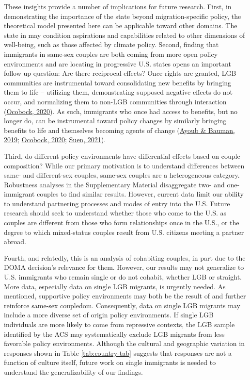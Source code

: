 \documentclass[
  11pt,
]{article}
\begin{document}
These insights provide a number of implications for future research. First, in demonstrating the importance of the state beyond migration-specific policy, the theoretical model presented here can be applicable toward other domains. The state in may condition aspirations and capabilities related to other dimensions of well-being, such as those affected by climate policy. Second, finding that immigrants in same-sex couples are both coming from more open policy environments and are locating in progressive U.S. states opens an important follow-up question: Are there reciprocal effects? Once rights are granted, LGB communities are instrumental toward consolidating new benefits by bringing them to life -- utilizing them, demonstrating supposed negative effects do not occur, and normalizing them to non-LGB communities through interaction (\protect\hyperlink{ref-ocobock_2020_leveraging}{Ocobock, 2020}). As such, immigrants who once had access to benefits, but no longer do, can be instrumental toward policy changes by similarly bringing benefits to life and themselves becoming agents of change (\protect\hyperlink{ref-ayoub_2019_migration}{Ayoub \& Bauman, 2019}; \protect\hyperlink{ref-ocobock_2020_leveraging}{Ocobock, 2020}; \protect\hyperlink{ref-suen_2021_sexual}{Suen, 2021}).

Third, do different policy environments have differential effects based on couple composition? While our primary motivation is to understand differences between same- and different-sex couples, same-sex couples are a heterogeneous category. Robustness analyses in the Supplementary Material disaggregate two- and one-immigrant couples to find similar results. However, current data limit our ability to understand partnering processes and modes of entry into the U.S. Future research should seek to understand whether those who come to the U.S. as couples are different from those who form relationships once in the U.S., or the degree to which mixed-status couples result from U.S. citizens meeting a partner abroad.

Fourth, and relatedly, this is an analysis of cohabiting couples, in part due to the DOMA decision's relevance for them. However, our results may not generalize to U.S. immigrants who remain single or do not cohabit, whether LGB or straight. More data, especially data on single LGB migrants, is urgently needed. As mentioned, supportive policy environments may both be the result of and further reinforce same-sex coupledom. Consequently, data on single LGB migrants may include a more diverse set of origin policy environments. If single LGB individuals are more likely to come from repressive contexts, the LGB sample identified by the ACS may systematically exclude LGB migrants from less favorable policy environments. Although the cultural and geographic variation in responses shown in Table \ref{tab:country-tab} suggests that responses are not a function of culture itself, future work on single immigrants is needed to understand the generalizability of our findings.
\end{document}
